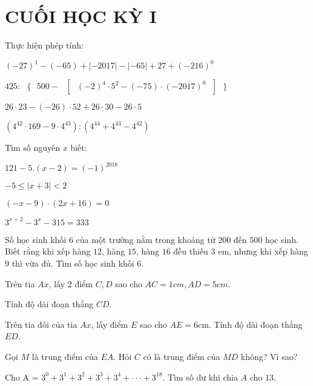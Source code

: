 \section{CUỐI HỌC KỲ I}
\setcounter{ex}{0}
\begin{ex}
	Thực hiện phép tính:
	\begin{listEX}
	\item	${{(-27)}^{1}}-(-65)+\left| -2017 \right|-\left| -65 \right|+27+{{(-216)}^{0}}$
\item $425:\text{ }\!\!\{\!\!\text{ }500-\text{ }\!\![\!\!\text{ }{{(-2)}^{4}}\cdot {{5}^{2}}-\left( -75 \right)\cdot {{(-2017)}^{0}}\text{ }\!\!]\!\!\text{  }\!\!\}\!\!\text{ }$
\item	$26\cdot 23-(-26)\cdot 52+26\cdot 30-26\cdot 5$
\item	$({{4}^{42}}\cdot 169-9\cdot {{4}^{43}}):({{4}^{44}}+{{4}^{43}}-{{4}^{42}})$
	\end{listEX}
\end{ex}
\begin{ex}
	Tìm số nguyên $x$ biết:
	\begin{listEX}[2]
	\item	$121-5.(x-2)={{(-1)}^{2018}}$
\item	$-5\le \left| x+3 \right|<2$
\item	$(-x-9)\cdot (2x+16)=0$
\item	${{3}^{x+2}}-{{3}^{x}}-315=333$
	\end{listEX}
\end{ex}
\begin{ex}
	Số học sinh khối $6$ của một trường nằm trong khoảng từ $200$ đến $500$ học sinh. Biết rằng khi xếp hàng $12$, hàng $15$, hàng $16$ đều thiếu $3$ em, nhưng khi xếp hàng $9$ thì vừa đủ. Tìm số học sinh khối $6$.
\end{ex}
\begin{ex}
	Trên tia $Ax$, lấy 2 điểm $C, D$ sao cho $AC = 1cm, AD = 5cm$.
		\begin{listEX}
			\item Tính độ dài đoạn thẳng $CD$.
\item Trên tia đối của tia $Ax$, lấy điểm $E$ sao cho $AE = 6$cm. Tính độ dài đoạn thẳng $ED$.
\item Gọi $M$ là trung điểm của $EA$. Hỏi $C$ có là trung điểm của $MD$ không? Vì sao?
		\end{listEX}
\end{ex}
\begin{ex}
	Cho A = ${{3}^{0}}+{{3}^{1}}+{{3}^{2}}+{{3}^{3}}+{{3}^{4}}+\cdot \cdot \cdot +{{3}^{18}}$. Tìm số dư khi chia $A$ cho $13$.
\end{ex}